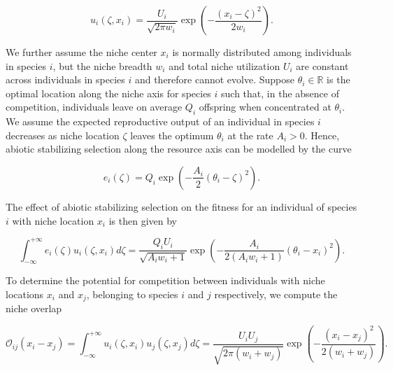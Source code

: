 \documentclass[]{elsarticle} %
\begin{document}
\begin{equation}
u_i(\zeta,x_i)=\frac{U_i}{\sqrt{2\pi w_i}}\exp\left(-\frac{(x_i-\zeta)^2}{2w_i}\right).
\end{equation}

We further assume the niche center \(x_i\) is normally distributed among
individuals in species \(i\), but the niche breadth \(w_i\) and total
niche utilization \(U_i\) are constant across individuals in species
\(i\) and therefore cannot evolve. Suppose \(\theta_i\in\mathbb R\) is
the optimal location along the niche axis for species \(i\) such that,
in the absence of competition, individuals leave on average \(Q_i\)
offspring when concentrated at \(\theta_i\). We assume the expected
reproductive output of an individual in species \(i\) decreases as niche
location \(\zeta\) leaves the optimum \(\theta_i\) at the rate
\(A_i>0\). Hence, abiotic stabilizing selection along the resource axis
can be modelled by the curve

\begin{equation}
e_i(\zeta)=Q_i\exp\left(-\frac{A_i}{2}(\theta_i-\zeta)^2\right).
\end{equation}

The effect of abiotic stabilizing selection on the fitness for an
individual of species \(i\) with niche location \(x_i\) is then given by

\begin{equation}
\int_{-\infty}^{+\infty}e_i(\zeta)u_i(\zeta,x_i)d\zeta=\frac{Q_iU_i}{\sqrt{A_iw_i+1}}\exp\left(-\frac{A_i}{2(A_iw_i+1)}(\theta_i-x_i)^2\right).
\end{equation}

To determine the potential for competition between individuals with
niche locations \(x_i\) and \(x_j\), belonging to species \(i\) and
\(j\) respectively, we compute the niche overlap

\begin{equation}
\mathcal O_{ij}(x_i-x_j)=\int_{-\infty}^{+\infty}u_i(\zeta,x_i)u_j(\zeta,x_j)d\zeta=\frac{U_iU_j}{\sqrt{2\pi(w_i+w_j)}}\exp\left(-\frac{(x_i-x_j)^2}{2(w_i+w_j)}\right).
\end{equation}
\end{document}
